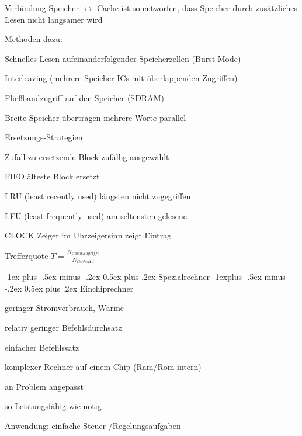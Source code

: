 \documentclass[a4paper]{article}
\makeatletter
\renewcommand{\section}{\@startsection{section}{1}{0mm}%
                                {-1ex plus -.5ex minus -.2ex}%
                                {0.5ex plus .2ex}%
                                {\normalfont\large\bfseries}}
\renewcommand{\subsection}{\@startsection{subsection}{2}{0mm}%
                                {-1explus -.5ex minus -.2ex}%
                                {0.5ex plus .2ex}%
                                {\normalfont\normalsize\bfseries}}
\makeatother
\begin{document}
\begin{multicols}{3}
\begin{itemize*}
    \item Verbindung Speicher $\leftrightarrow$ Cache ist so entworfen, dass Speicher durch zusätzliches Lesen nicht langsamer wird
    \item Methoden dazu:
    \begin{itemize*}
      \item Schnelles Lesen aufeinanderfolgender Speicherzellen (Burst Mode)
      \item Interleaving (mehrere Speicher ICs mit überlappenden Zugriffen)
      \item Fließbandzugriff auf den Speicher (SDRAM)
      \item Breite Speicher übertragen mehrere Worte parallel
    \end{itemize*}
    \item Ersetzungs-Strategien
    \begin{description*}
      \item[Zufall] zu ersetzende Block zufällig ausgewählt
      \item[FIFO] älteste Block ersetzt
      \item[LRU](least recently used) längsten nicht zugegriffen
      \item[LFU](least frequently used) am seltensten gelesene
      \item[CLOCK] Zeiger im Uhrzeigersinn zeigt Eintrag
    \end{description*}
    \item Trefferquote $T=\frac{N_{Cache Zugriffe}}{N_{Cache Hit}}$
  \end{itemize*}
  
  \section{Spezialrechner}
  \subsection{Einchiprechner}
  \begin{itemize*}
    \item geringer Stromverbrauch, Wärme
    \item relativ geringer Befehlsdurchsatz
    \item einfacher Befehlssatz
    \item komplexer Rechner auf einem Chip (Ram/Rom intern)
    \item an Problem angepasst
    \item so Leistungsfähig wie nötig
    \item Anwendung: einfache Steuer-/Regelungsaufgaben
  \end{itemize*}
  

\end{multicols}
\end{document}
